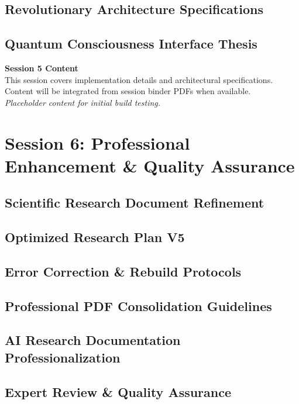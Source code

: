 \documentclass[12pt,oneside]{book}
\begin{document}
\chapter{Revolutionary Architecture Specifications}
\chapter{Quantum Consciousness Interface Thesis}

\vspace{2cm}
\begin{center}
{\Large \textbf{Session 5 Content}}\\[12pt]
{\normalsize This session covers implementation details and architectural specifications.}\\
{\normalsize Content will be integrated from session binder PDFs when available.}\\[12pt]
{\itshape Placeholder content for initial build testing.}
\end{center}
\newpage

\part*{Session 6: Professional Enhancement \& Quality Assurance}
\chapter{Scientific Research Document Refinement}
\chapter{Optimized Research Plan V5}
\chapter{Error Correction \& Rebuild Protocols}
\chapter{Professional PDF Consolidation Guidelines}
\chapter{AI Research Documentation Professionalization}
\chapter{Expert Review \& Quality Assurance}
\end{document}
